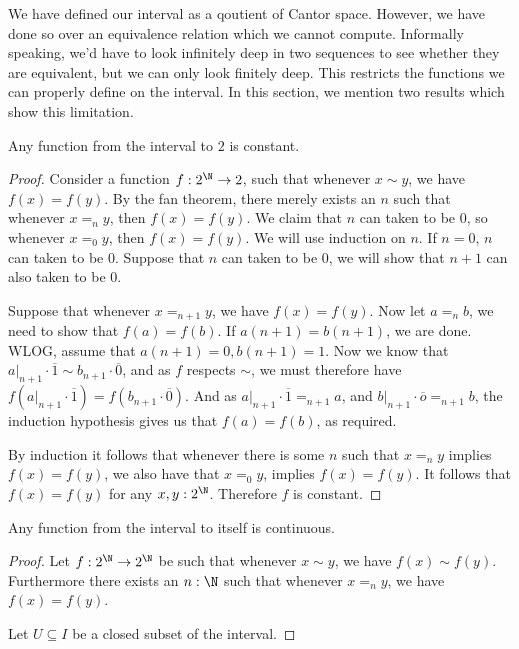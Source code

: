 We have defined our interval as a qoutient of Cantor space. 
However, we have done so over an equivalence relation which we cannot compute. 
Informally speaking, we'd have to look infinitely deep in two sequences to see whether
they are equivalent, but we can only look finitely deep. 
This restricts the functions we can properly define on the interval. 
In this section, we mention two results which show this limitation. 
\begin{lemma}
  Any function from the interval to $2$ is constant. 
\end{lemma}
\begin{proof}
  Consider a function $f: 2^\N \to 2$, 
  such that whenever $x\sim y$, we have $f(x) = f(y)$. 
  By the fan theorem, there merely exists an $n$ such that 
  whenever $x =_n y$, then $f(x) = f(y)$. 
  We claim that $n$ can taken to be $0$, 
  so whenever $x =_0 y $, then $f(x) = f(y)$. 
  We will use induction on $n$. If $n=0$, $n$ can taken to be $0$. 
  Suppose that $n$ can taken to be $0$, we will show that 
  $n+1$ can also taken to be $0$. 

  Suppose that whenever $x =_{n+1} y$, we have $f(x) = f(y)$. 
  Now let $a =_n b$, we need to show that $f(a) = f(b)$. 
  If $a(n+1) = b(n+1)$, we are done. WLOG, 
  assume that $a(n+1) = 0, b(n+1) = 1$. 
  Now we know that 
  $a|_{n+1} \cdot \overline 1 \sim b_{n+1} \cdot \overline 0$, 
  and as $f$ respects $\sim$, we must therefore have 
  $f(a|_{n+1} \cdot \overline 1)  = f( b_{n+1} \cdot \overline 0)$. 
  And as $a|_{n+1} \cdot \overline 1 =_{n+1} a$, 
  and 
  $b|_{n+1} \cdot \overline o =_{n+1} b$, 
  the induction hypothesis gives us that 
  $f(a)  = f(b)$, as required. 

  By induction it follows that whenever there is some $n$ such that 
  $x=_n y$ implies $f(x) = f(y)$, we also have that 
  $x =_0 y$, implies $f(x) = f(y)$. 
  It follows that $f(x) = f(y)$ for any $x,y : 2^\N$. 
  Therefore $f$ is constant. 
\end{proof}

\begin{lemma}
  Any function from the interval to itself is continuous. 
\end{lemma}
\begin{proof}
  Let $f: 2^\N \to 2^\N$ be such that whenever 
  $x\sim y$, we have $f(x) \sim f(y)$. 
  Furthermore there exists an $n:\N$ such that whenever 
  $x =_n y$, we have $f(x) = f(y)$. 

  Let $U \subseteq I$ be a closed subset of the interval. 
\end{proof} 

